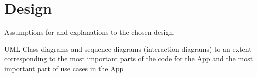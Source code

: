 \chapter{Design}
Assumptions for and explanations to the chosen design.

UML Class diagrams and sequence diagrams (interaction diagrams) to an extent corresponding to the most important parts of the code for the App and the most important part of use cases in the App
